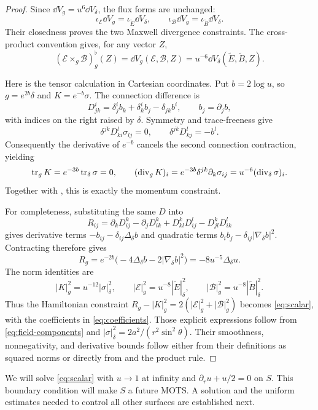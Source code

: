 \begin{proof}
Since $\dd V_g=u^6\dd V_\delta$, the flux forms are unchanged:
\begin{equation}
\label{eq:conformal-fluxes}
 \iota_{\mathcal E}\dd V_g=\iota_{\widetilde E}\dd V_\delta,
 \qquad
 \iota_{\mathcal B}\dd V_g=\iota_{\widetilde B}\dd V_\delta.
\end{equation}
Their closedness proves the two Maxwell divergence constraints.  The
cross-product convention gives, for any vector $Z$,
\[
 (\mathcal E\times_g\mathcal B)^\flat_g(Z)
 =\dd V_g(\mathcal E,\mathcal B,Z)
 =u^{-6}\dd V_\delta(\widetilde E,\widetilde B,Z).
\]

Here is the tensor calculation in Cartesian coordinates.  Put $b=2\log u$,
so $g=e^{2b}\delta$ and $K=e^{-b}\sigma$.  The connection difference is
\[
 D^i_{jk}=\delta^i_j b_k+\delta^i_k b_j-\delta_{jk}b^i,
 \qquad b_j=\partial_jb,
\]
with indices on the right raised by $\delta$.  Symmetry and trace-freeness
give
\[
 \delta^{jk}D^l_{ki}\sigma_{lj}=0,\qquad
 \delta^{jk}D^l_{kj}=-b^l.
\]
Consequently the derivative of $e^{-b}$ cancels the second connection
contraction, yielding
\begin{equation}
\label{eq:conformal-divergence}
 \operatorname{tr}_gK=e^{-3b}\operatorname{tr}_\delta\sigma=0,\qquad
 (\operatorname{div}_gK)_i
 =e^{-3b}\delta^{jk}\partial_k\sigma_{ij}
 =u^{-6}(\operatorname{div}_\delta\sigma)_i.
\end{equation}
Together with , this is exactly the momentum constraint.

For completeness, substituting the same $D$ into
\[
 R_{ij}=\partial_kD^k_{ij}-\partial_jD^k_{ik}
          +D^k_{kl}D^l_{ij}-D^k_{jl}D^l_{ik}
\]
gives derivative terms $-b_{ij}-\delta_{ij}\Delta_\delta b$ and quadratic
terms $b_i b_j-\delta_{ij}|\nabla_\delta b|^2$.  Contracting therefore gives
\begin{equation}
\label{eq:conformal-curvature}
 R_g=e^{-2b}\bigl(-4\Delta_\delta b
                         -2|\nabla_\delta b|^2\bigr)
     =-8u^{-5}\Delta_\delta u.
\end{equation}
The norm identities are
\[
 |K|_g^2=u^{-12}|\sigma|_\delta^2,\qquad
 |\mathcal E|_g^2=u^{-8}|\widetilde E|_\delta^2,\qquad
 |\mathcal B|_g^2=u^{-8}|\widetilde B|_\delta^2.
\]
Thus the Hamiltonian constraint
$R_g-|K|_g^2=2(|\mathcal E|_g^2+|\mathcal B|_g^2)$ becomes
\eqref{eq:scalar}, with the coefficients in \eqref{eq:coefficients}.
Those explicit expressions follow from \eqref{eq:field-components} and
$|\sigma|_\delta^2=2a^2/(r^2\sin^2\theta)$.
Their smoothness, nonnegativity, and derivative bounds follow either from
their definitions as squared norms or directly from
 and the product rule.
\end{proof}

We will solve \eqref{eq:scalar} with $u\to1$ at infinity and
$\partial_ru+u/2=0$ on $S$.  This boundary condition will make $S$ a future
MOTS.  A solution and the uniform estimates needed to control all other
surfaces are established next.
